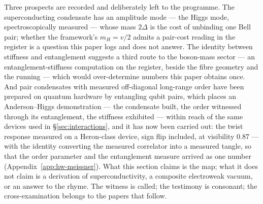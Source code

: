 Three prospects are recorded and deliberately left to the programme. The superconducting
condensate has an amplitude mode --- the Higgs mode, spectroscopically measured --- whose mass
$2\Delta$ is the cost of unbinding one Bell pair; whether the framework's $m_{H} = v/2$ admits a
pair-cost reading in the register is a question this paper logs and does not answer. The identity
between stiffness and entanglement suggests a third route to the boson-mass sector --- an
entanglement-stiffness computation on the register, beside the fibre geometry and the running ---
which would over-determine numbers this paper obtains once. And pair condensates with measured
off-diagonal long-range order have been prepared on quantum hardware by entangling qubit pairs,
which places an Anderson--Higgs demonstration --- the condensate built, the order witnessed
through its entanglement, the stiffness exhibited --- within reach of the same devices used in
\S\ref{sec:interactions}, and it has now been carried out: the twist response measured on a
Heron-class device, sign flip included, at visibility $0.87$ --- with the identity converting
the measured correlator into a measured tangle, so that the order parameter and the entanglement
measure arrived as one number (Appendix~\ref{app:hw-meissner}). What this section claims is the map; what it
does not claim is a derivation of superconductivity, a composite electroweak vacuum, or an answer
to the rhyme. The witness is called; the testimony is consonant; the cross-examination belongs to
the papers that follow.
